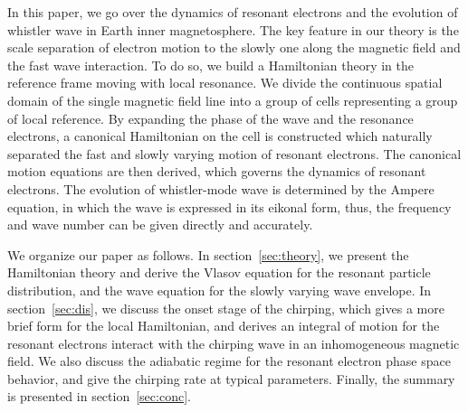 In this paper, we go over the dynamics of resonant electrons and the evolution of whistler wave in Earth inner magnetosphere. The key feature in our theory is the scale separation of electron motion to the slowly one along the magnetic field and the fast wave interaction. 
To do so, we build a Hamiltonian theory in the reference frame moving with local resonance.
We divide the continuous spatial domain of the single magnetic field line into a group of cells representing a group of local reference.
By expanding the phase of the wave and the resonance electrons, a canonical Hamiltonian on the cell is constructed which naturally separated the fast and slowly varying motion of resonant electrons.
The canonical motion equations are then derived, which governs the dynamics of resonant electrons. 
The evolution of whistler-mode wave is determined by the Ampere equation, in which the wave is expressed in its eikonal form, thus, the frequency and wave number can be given directly and accurately.

We organize our paper as follows. In section~\ref{sec:theory}, we present the Hamiltonian theory and derive the Vlasov equation for the resonant particle distribution, and the wave equation for the slowly varying wave envelope.
In section~\ref{sec:dis}, we discuss the onset stage of the chirping, which gives a more brief form for the local Hamiltonian, and derives an integral of motion for the resonant electrons interact with the chirping wave in an inhomogeneous magnetic field. We also discuss the adiabatic regime for the resonant electron phase space behavior, and give the chirping rate at typical parameters.  
Finally, the summary is presented in section~\ref{sec:conc}.
